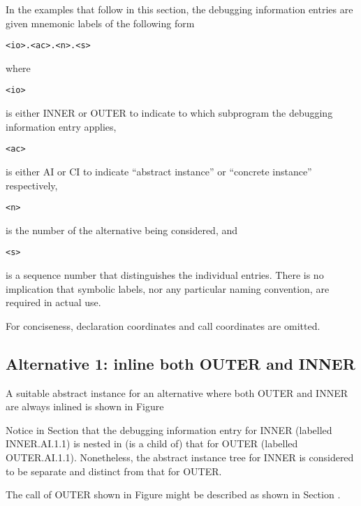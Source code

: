 In the examples that follow in this section, the debugging
information entries are given mnemonic labels of the following
form

\begin{lstlisting}
<io>.<ac>.<n>.<s>
\end{lstlisting}

where \begin{verbatim}<io>\end{verbatim}
is either INNER or OUTER to indicate to which
subprogram the debugging information entry applies, 
\begin{verbatim}<ac>\end{verbatim}
is either AI or CI to indicate ``abstract instance'' or
``concrete instance'' respectively, 
\begin{verbatim}<n>\end{verbatim}
is the number of the
alternative being considered, and 
\begin{verbatim}<s>\end{verbatim}
is a sequence number that
distinguishes the individual entries. There is no implication
that symbolic labels, nor any particular naming convention,
are required in actual use.

For conciseness, declaration coordinates and call coordinates are omitted.

\subsection{Alternative 1: inline both OUTER and INNER}
\label{app:inlinebothouterandinner}

A suitable abstract instance for an alternative where both
OUTER and INNER are always inlined is shown in 
Figure 

Notice in 
Section  
that the debugging information entry for
INNER (labelled INNER.AI.1.1) is nested in (is a child of)
that for OUTER (labelled OUTER.AI.1.1). Nonetheless, the
abstract instance tree for INNER is considered to be separate
and distinct from that for OUTER.

The call of OUTER shown in 
Figure 
might be described as
shown in 
Section .


